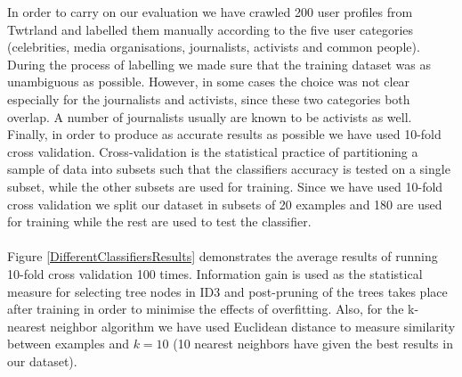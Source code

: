 In order to carry on our evaluation we have crawled 200 user profiles from Twtrland and labelled them manually according to the five user categories (celebrities, media organisations, journalists, activists and common people). During the process of labelling we made sure that the training dataset was as unambiguous as possible. However, in some cases the choice was not clear especially for the journalists and activists, since these two categories both overlap. A number of journalists usually are known to be activists as well. Finally, in order to produce as accurate results as possible we have used 10-fold cross validation. Cross-validation is the statistical practice of partitioning a sample of data into subsets such that the classifiers accuracy is tested on a single subset, while the other subsets are used for training. Since we have used 10-fold cross validation we split our dataset in subsets of 20 examples and 180 are used for training while the rest are used to test the classifier.\\\\
Figure \ref{DifferentClassifiersResults} demonstrates the average results of running 10-fold cross validation 100 times. Information gain is used as the statistical measure for selecting tree nodes in ID3 and post-pruning of the trees takes place after training in order to minimise the effects of overfitting. Also, for the k-nearest neighbor algorithm we have used Euclidean distance to measure similarity between examples and $k=10$ (10 nearest neighbors have given the best results in our dataset). 


